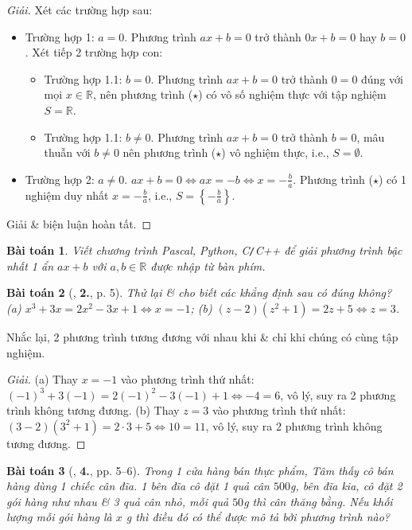 \documentclass{article}
\numberwithin{equation}{section}
\newtheorem{baitoan}{Bài toán}
\begin{document}
\begin{proof}[Giải]
	Xét các trường hợp sau:
	\begin{itemize}
		\item Trường hợp 1: $a = 0$. Phương trình $ax + b = 0$ trở thành $0x + b = 0$ hay $b = 0$. Xét tiếp 2 trường hợp con:
		\begin{itemize}
			\item Trường hợp 1.1: $b = 0$. Phương trình $ax + b = 0$ trở thành $0 = 0$ đúng với mọi $x\in\mathbb{R}$, nên phương trình ($\star$) có vô số nghiệm thực với tập nghiệm $S = \mathbb{R}$.
			\item Trường hợp 1.1: $b\ne0$. Phương trình $ax + b = 0$ trở thành $b = 0$, mâu thuẫn với $b\ne0$ nên phương trình ($\star$) vô nghiệm thực, i.e., $S = \emptyset$.
		\end{itemize}
		\item Trường hợp 2: $a\ne0$. $ax + b = 0\Leftrightarrow ax = -b\Leftrightarrow x = -\frac{b}{a}$. Phương trình ($\star$) có 1 nghiệm duy nhất $x = -\frac{b}{a}$, i.e., $S = \left\{-\frac{b}{a}\right\}$.
	\end{itemize}
	Giải \& biện luận hoàn tất.
\end{proof}

\begin{baitoan}
	Viết chương trình Pascal, Python, C\emph{\texttt{/}}C++ để giải phương trình bậc nhất 1 ẩn $ax + b$ với $a,b\in\mathbb{R}$ được nhập từ bàn phím.
\end{baitoan}

\begin{baitoan}[\cite{SBT_Toan_8_tap_2}, \textbf{2.}, p. 5]
	Thử lại \& cho biết các khẳng định sau có đúng không? (a) $x^3 + 3x = 2x^2 - 3x + 1\Leftrightarrow x = -1$; (b) $(z - 2)(z^2 + 1) = 2z + 5\Leftrightarrow z = 3$.
\end{baitoan}
Nhắc lại, 2 phương trình tương đương với nhau khi \& chỉ khi chúng có cùng tập nghiệm.

\begin{proof}[Giải]
	(a) Thay $x = -1$ vào phương trình thứ nhất: $(-1)^3 + 3(-1) = 2(-1)^2 - 3(-1) + 1\Leftrightarrow-4 = 6$, vô lý, suy ra 2 phương trình không tương đương. (b) Thay $z = 3$ vào phương trình thứ nhất: $(3 - 2)(3^2 + 1) = 2\cdot3 + 5\Leftrightarrow10 = 11$, vô lý, suy ra 2 phương trình không tương đương.
\end{proof}

\begin{baitoan}[\cite{SBT_Toan_8_tap_2}, \textbf{4.}, pp. 5--6]
	Trong 1 cửa hàng bán thực phẩm, Tâm thấy cô bán hàng dùng 1 chiếc cân đĩa. 1 bên đĩa cô đặt 1 quả cân $500$\emph{g}, bên đĩa kia, cô đặt 2 gói hàng như nhau \& 3 quả cân nhỏ, mỗi quả $50$\emph{g} thì cân thăng bằng. Nếu khối lượng mỗi gói hàng là $x$ \emph{g} thì điều đó có thể được mô tả bởi phương trình nào?
\end{baitoan}
\end{document}
